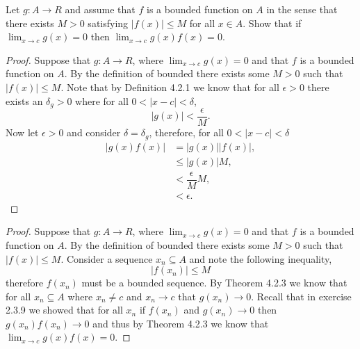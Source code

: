 \documentclass[12pt]{article}
\makeatletter
\theoremstyle{homework}
\newenvironment{exercise}[1]
{\def\@currentlabel{#1}\exercisecore}
{\endexercisecore}
\makeatother
\begin{document}
\begin{exercise}{Abbott 4.2.7} Let $g: A \to R$ and assume that $f$ is a bounded function on $A$ in the sense
that there exists $M>0$ satisfying $|f(x)| \le M$ for all $x \in A$. Show that if $\lim_{x \to c}g(x) = 0$ then 
$\lim_{x \to c}g(x)f(x) = 0$.\\

\begin{proof}
  Suppose that $g: A \to R$, where $\lim_{x \to c}g(x) = 0$ and that $f$ is a bounded function on $A$. By the definition of bounded there exists some 
  $M>0$ such that $|f(x)| \le M$. Note that by Definition 4.2.1 we know that for all $\epsilon > 0$ there exists an $\delta_g > 0$ where for all
  $0< |x - c| < \delta$,
  \begin{equation*}
    |g(x)| < \dfrac{\epsilon}{M}.
  \end{equation*}
Now let $\epsilon > 0$ and consider $\delta = \delta_g$, therefore, for all $0< |x - c| < \delta$ 
\begin{align*}
  |g(x)f(x)| &=|g(x)||f(x)|,\\
  &\leq |g(x)|M,\\
  &< \dfrac{\epsilon}{M}M,\\
  &< \epsilon.
\end{align*}

\end{proof}

\vspace{.25in}

\begin{proof} Suppose that $g: A \to R$, where $\lim_{x \to c}g(x) = 0$ and that $f$ is a bounded function on $A$. By the definition of bounded there exists some 
  $M>0$ such that $|f(x)| \le M$. Consider a sequence $x_n \subseteq A$ and note the following inequality,
  \begin{equation*}
    |f(x_n)| \le M
  \end{equation*}
therefore $f(x_n)$ must be a bounded sequence. By Theorem 4.2.3 we know that for all $x_n \subseteq A$ where $x_n \neq c$ and $x_n \to c$ 
that $g(x_n) \to 0$. Recall that in exercise 2.3.9 we showed that for all $x_n$ if $f(x_n)$ and $g(x_n) \to 0$ then $g(x_n)f(x_n) \to 0$ and thus by Theorem 4.2.3
we know that  $\lim_{x \to c}g(x)f(x) = 0$.
\end{proof}
\end{exercise}
\vspace{.25in}
\end{document}
